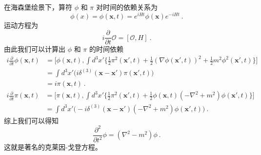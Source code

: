 
在海森堡绘景下，算符 $\phi$ 和 $\pi$ 对时间的依赖关系为
\begin{equation}
\phi(x) = \phi(\mathbf x, t) = e^{i H t}\phi(\mathbf x)e^{-iHt}~.
\end{equation}
运动方程为 
\begin{equation}
i \frac{\partial}{\partial t}\mathcal O = [\mathcal O, H]~.
\end{equation}
由此我们可以计算出 $\phi$ 和 $\pi$ 的时间依赖
\begin{equation}
\begin{aligned}
i \frac{\partial}{\partial t} \phi(\mathbf x,t) & = \bigg[\phi(\mathbf x,t),\int d^3 x' \bigg\{ \frac{1}{2} \pi^2 (\mathbf x',t) + \frac{1}{2} (\nabla \phi(\mathbf x',t))^2 + \frac{1}{2} m^2 \phi^2(\mathbf x',t) \bigg\}\bigg] \\
& = \int d^3 x' \bigg(i \delta^{(3)} (\mathbf x - \mathbf x') \pi(\mathbf x',t) \bigg) \\
& = i \pi (\mathbf x, t)~.
\end{aligned}
\end{equation}
\begin{equation}
\begin{aligned}
i\frac{\partial}{\partial t} \pi(\mathbf x, t) & = \bigg[ \pi(\mathbf x,t), \int d^3 x' \bigg\{  \frac{1}{2} \pi^2 (\mathbf x', t) + \frac{1}{2} \phi(\mathbf x, t) (-\nabla^2 + m^2 ) \phi(\mathbf x', t) \bigg\} \bigg] \\
& = \int d^3 x' \bigg( - i \delta^{(3)} (\mathbf x - \mathbf x') (-\nabla^2+m^2) \phi(\mathbf x',t) \bigg)~.
\end{aligned}
\end{equation}
综上我们可以得知
\begin{equation}
\frac{\partial^2}{\partial t^2} \phi = (\nabla^2 - m^2)\phi~.
\end{equation}
这就是著名的克莱因-戈登方程。

